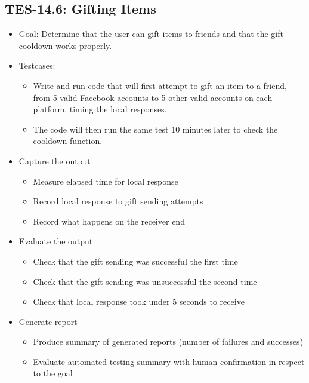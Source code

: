 \subsection{TES-14.6: Gifting Items}
\begin{itemize}
\item Goal: Determine that the user can gift items to friends and that the
gift cooldown works properly.

\item Testcases: 
\begin{itemize}
\item Write and run code that will first attempt to gift an item to a friend,
from 5 valid Facebook accounts to 5 other valid accounts on each platform, 
timing the local responses.
\item The code will then run the same test 10 minutes later to check the 
cooldown function.
\end{itemize}

\item Capture the output 
\begin{itemize}
\item Measure elapsed time for local response
\item Record local response to gift sending attempts
\item Record what happens on the receiver end
\end{itemize}

\item Evaluate the output 
\begin{itemize}
\item Check that the gift sending was successful the first time
\item Check that the gift sending was unsuccessful the second time
\item Check that local response took under 5 seconds to receive
\end{itemize}

\item Generate report 
\begin{itemize}
\item Produce summary of generated reports (number of failures and successes)
\item Evaluate automated testing summary with human confirmation in respect to the goal
\end{itemize}
\end{itemize}


